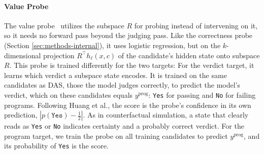 \paragraph{Value Probe}
The value probe~\cite{Huang2025Internal} utilizes the subspace $R$ for probing instead of
intervening on it, so it needs no forward pass beyond the judging pass. Like the correctness probe (Section \ref{sec:methods-internal}), it uses logistic regression, but on
the $k$-dimensional projection $R^{\top} h_\ell(x, c)$ of the candidate's hidden state onto subspace $R$. %
This probe is trained differently for the two targets:
For the verdict target, it learns which verdict a subspace state encodes. It is trained on the same candidates as DAS, those the model judges correctly,
to predict the model's verdict, which on these candidates equals $y^{\mathrm{prog}}$: \texttt{Yes} for passing and \texttt{No} for failing programs. Following Huang et al., the
score is the probe's confidence in its own prediction, $|p(\texttt{Yes}) - \tfrac12|$. As in counterfactual simulation, a state that clearly reads as \texttt{Yes} or \texttt{No} indicates certainty and a probably correct verdict.
For the program target, we train the probe on all training candidates to predict $y^{\mathrm{prog}}$, and its probability of \texttt{Yes} is the score. 






